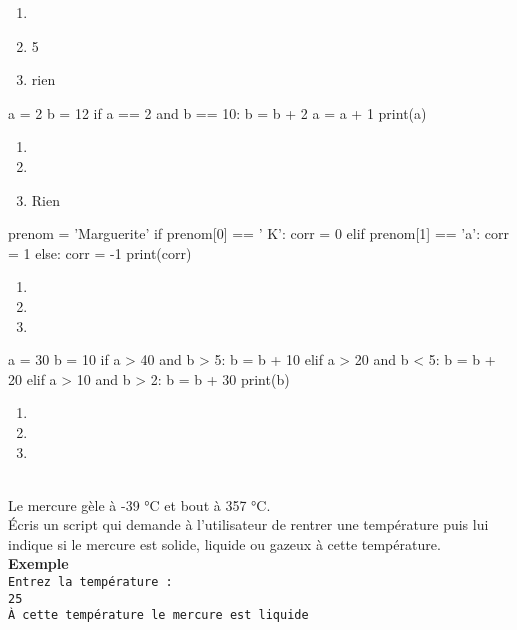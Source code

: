 \documentclass[a4paper,10pt]{article}
\begin{document}
\begin{multicols}{2}
\begin{enumerate}[\case\ \ a.]
\item 	{}
\item 	5
\item 	rien
\end{enumerate}
\begin{pythoncode}
a = 2
b = 12
if a == 2 and b == 10:
    b = b + 2
    a = a + 1
    print(a)
\end{pythoncode}
\begin{enumerate}[\case\ \ a.]
\item 	{}
\item 	{}
\item 	Rien
\end{enumerate}
\newpage
\begin{pythoncode}
prenom = 'Marguerite'
if prenom[0] == ' K':
    corr = 0
elif prenom[1] == 'a':
    corr = 1
else:
    corr = -1
print(corr)
\end{pythoncode}
\begin{enumerate}[\case\ \ a.]
\item 	{}
\item 	{}
\item 	{}
\end{enumerate}
\begin{pythoncode}
a = 30
b = 10
if a > 40 and b > 5:
    b = b + 10
elif a > 20 and b < 5:
    b = b + 20
elif a > 10 and b > 2:
    b = b + 30
print(b)
\end{pythoncode}
\begin{enumerate}[\case\ \ a.]
\item 	{}
\item 	{}
\item 	{}
\end{enumerate}
\end{multicols}
\ \\

Le mercure gèle à -39 °C et bout à 357 °C.\\
Écris un script qui demande à l'utilisateur de rentrer une température puis
lui indique si le mercure est solide, liquide ou gazeux à cette température.\\

\textbf{Exemple}\\

\texttt{Entrez la température :\\
25\\
À cette température le mercure est liquide\\
}

\end{document}
